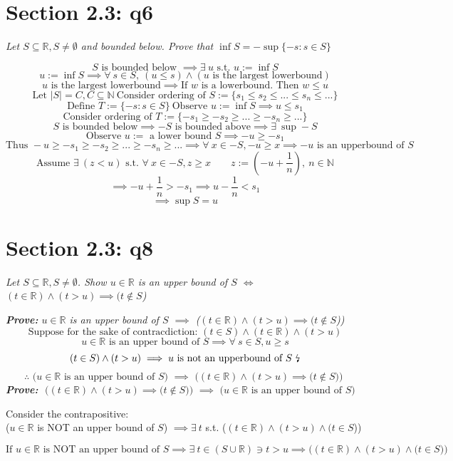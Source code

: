 \documentclass[11pt]{article}
\newcommand{\question}[1]{
    \begin{mdframed}[
        linecolor=gray,       %
        linewidth=0.5pt,      %
        innertopmargin=10pt,  %
        innerbottommargin=10pt %
    ]
    \centering \itshape \color{gray} #1
    \end{mdframed}
}
\theoremstyle{plain}
\begin{document}
\section*{Section 2.3: q6}
\question{Let $S \subseteq \mathbb{R}, S \neq \emptyset$ and bounded below. Prove that $\inf S = -\sup \{ -s : s \in S \}$}
\[ S \text{ is bounded below } \implies \exists ~u \text{ s.t. } u := \inf S \]
\[ u:= \inf S \implies \forall ~s \in S, ~(u \leq s) \land (u \text{ is the largest lowerbound}) \]
\[ u \text{ is the largest lowerbound} \implies \text{If } w \text{ is a lowerbound. Then } w \leq u  \]
\[ \text{Let } |S| = C, C \subseteq \mathbb{N} ~\text{Consider ordering of } S := \{ s_1 \leq s_2 \leq ... \leq s_n \leq ...  \} \]
\[ \text{Define } T := \{ -s : s \in S \} ~\text{Observe } u:= \inf S \implies u \leq s_1 \]
\[ \text{Consider ordering of } T := \{ -s_1 \geq -s_2 \geq ... \geq -s_n \geq ...  \} \]
\[ \text{$S$ is bounded below} \implies -S \text{ is bounded above} \implies  \exists ~\sup -S \]
\[ \text{Observe } u:= \text{ a lower bound } S \implies -u \geq -s_1 \]
\[ \text{Thus } -u \geq -s_1 \geq -s_2 \geq ... \geq -s_n \geq ... \implies \forall ~x \in -S, -u \geq x \implies -u \text{ is an upperbound of } S\]
\[ \text{Assume } \exists ~(z<u) \text{ s.t. }  \forall ~x \in -S, z \geq x \quad \quad z := (-u + \frac{1}{n}), ~n \in \mathbb{N}  \]
\[
	\implies
	-u + \frac{1}{n} > -s_1
	\implies
	u - \frac{1}{n} < s_1
\]
\[
    \implies \sup S = u
\] 
\section*{Section 2.3: q8}
\question{Let $S \subseteq \mathbb{R}, S \neq \emptyset$. Show $u \in \mathbb{R}$ is an upper bound of $S$ $\iff$ $(t \in \mathbb{R}) \land (t>u) \implies (t \not \in S$)}
\textit{\textbf{Prove: } $u \in \mathbb{R}$ is an upper bound of $S$ $\implies$ ($(t \in \mathbb{R}) \land (t>u) \implies (t \not \in S$))}
\[ \text{Suppose for the sake of contracdiction: }  (t \in S) \land (t \in \mathbb{R}) \land (t>u) \]
\[ \text{$u \in \mathbb{R}$ is an upper bound of $S$} \implies \forall ~s \in S, u \geq s \]
\[ \text{$ (t\in S) \land  (t>u) \implies u$ is not an upperbound of $S$ \lightning } \]
\[ \therefore \text{ ($u \in \mathbb{R}$ is an upper bound of $S$) $\implies$ ($(t \in \mathbb{R}) \land (t>u) \implies (t \not \in S$)) } \]
\textit{\textbf{Prove: } $\text{ ($(t \in \mathbb{R}) \land (t>u) \implies (t \not \in S$)) $\implies $ ($u \in \mathbb{R}$ is an upper bound of $S$)}$}
\begin{center}
	Consider the contrapositive:\\
	($u \in \mathbb{R}$ is NOT an upper bound of $S$) $\implies \exists ~t$ s.t. ($(t \in \mathbb{R}) \land (t>u) \land (t \in S$))
\end{center}
\[ \text{If $u \in \mathbb{R}$ is NOT an upper bound of $S$} \implies \exists ~t \in (S \cup \mathbb{R}) \ni t > u \implies \text{($(t \in \mathbb{R}) \land (t>u) \land (t \in S$))} \]
\end{document}
